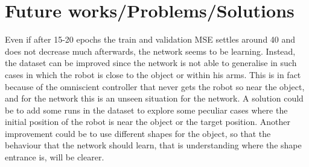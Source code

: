 \section{Future works/Problems/Solutions}
Even if after 15-20 epochs the train and validation MSE settles around 40 and does not decrease much afterwards, the 
network seems to be learning. Instead, the dataset can be improved since the network is not able to generalise in such 
cases in which the robot is close to the object or within his arms. This is in fact because of the omniscient 
controller that never gets the robot so near the object, and for the network this is an unseen situation for the 
network.
A solution could be to add some runs in the dataset to explore some peculiar cases where the initial position of the 
robot is near the object or the target position.
Another improvement could be to use different shapes for the object, so that the behaviour that the network should 
learn, that is understanding where the shape entrance is, will be clearer.
%
%
%
%
%
%
%
